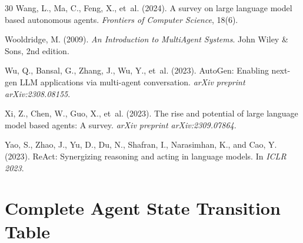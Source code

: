 \documentclass[12pt,a4paper]{article}
\theoremstyle{definition}
\theoremstyle{remark}
\begin{document}
\begin{thebibliography}{30}
Wang, L., Ma, C., Feng, X., et~al. (2024).
\newblock A survey on large language model based autonomous agents.
\newblock \emph{Frontiers of Computer Science}, 18(6).

Wooldridge, M. (2009).
\newblock \emph{An Introduction to MultiAgent Systems}.
\newblock John Wiley \& Sons, 2nd edition.

Wu, Q., Bansal, G., Zhang, J., Wu, Y., et~al. (2023).
\newblock AutoGen: Enabling next-gen LLM applications via multi-agent conversation.
\newblock \emph{arXiv preprint arXiv:2308.08155}.

Xi, Z., Chen, W., Guo, X., et~al. (2023).
\newblock The rise and potential of large language model based agents: A survey.
\newblock \emph{arXiv preprint arXiv:2309.07864}.

Yao, S., Zhao, J., Yu, D., Du, N., Shafran, I., Narasimhan, K., and Cao, Y. (2023).
\newblock ReAct: Synergizing reasoning and acting in language models.
\newblock In \emph{ICLR 2023}.

\end{thebibliography}

\appendix

\section{Complete Agent State Transition Table}\label{app:state-machine}
\end{document}

